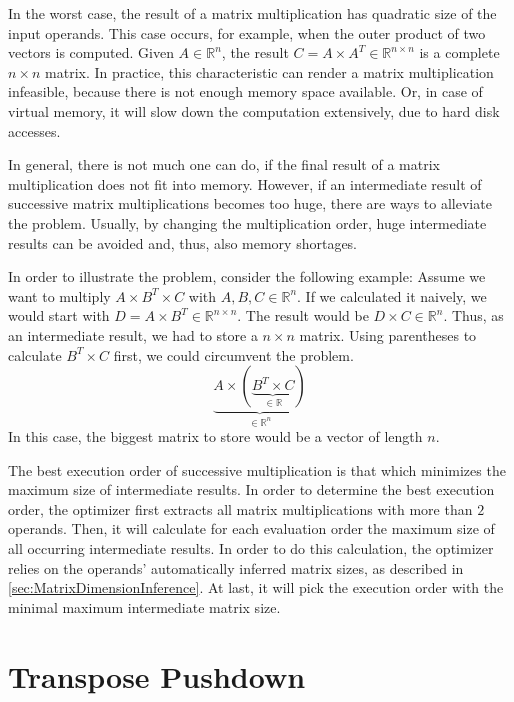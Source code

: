 In the worst case, the result of a matrix multiplication has quadratic size of the input operands.
This case occurs, for example, when the outer product of two vectors is computed.
Given $A \in \mathbb{R}^{n}$, the result $C = A\times A^T \in \mathbb{R}^{n\times n}$ is a complete $n\times n$ matrix.
In practice, this characteristic can render a matrix multiplication infeasible, because there is not enough memory space available.
Or, in case of virtual memory, it will slow down the computation extensively, due to hard disk accesses.

In general, there is not much one can do, if the final result of a matrix multiplication does not fit into memory.
However, if an intermediate result of successive matrix multiplications becomes too huge, there are ways to alleviate the problem.
Usually, by changing the multiplication order, huge intermediate results can be avoided and, thus, also memory shortages.

In order to illustrate the problem, consider the following example:
Assume we want to multiply $A\times B^T \times C$ with $A,B,C\in \mathbb{R}^{n}$.
If we calculated it naively, we would start with $D=A\times B^T \in \mathbb{R}^{n\times n}$.
The result would be $D\times C \in \mathbb{R}^{n}$.
Thus, as an intermediate result, we had to store a $n\times n$ matrix.
Using parentheses to calculate $B^T \times C$ first, we could circumvent the problem.
\begin{displaymath}
	\underbrace{A\times \left( \underbrace{B^T \times C}_{\in \mathbb{R}}\right)}_{\in \mathbb{R}^{n}}
\end{displaymath}
In this case, the biggest matrix to store would be a vector of length $n$.

The best execution order of successive multiplication is that which minimizes the maximum size of intermediate results.
In order to determine the best execution order, the optimizer first extracts all matrix multiplications with more than $2$ operands.
Then, it will calculate for each evaluation order the maximum size of all occurring intermediate results.
In order to do this calculation, the optimizer relies on the operands' automatically inferred matrix sizes, as described in \cref{sec:MatrixDimensionInference}.
At last, it will pick the execution order with the minimal maximum intermediate matrix size.

\section{Transpose Pushdown}

